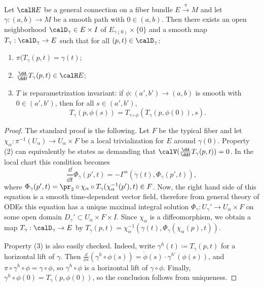 \begin{thm}\label{prop parallel tra}
    Let $\calH E$ be a general connection on a fiber bundle $E\overset{\pi}{\to}M$ and let $\gamma:(a,b)\to M$ be a smooth path with $0\in(a,b)$. Then there exists an open neighborhood $\calD_\gamma\in E\times I$ of $E_{\gamma(0)}\times\{0\}$ and a smooth map $T_\gamma:\calD_\gamma\to E$ such that for all $(p,t)\in \calD_\gamma$: 
    \begin{enumerate}[label=(\arabic*)]
        \item $\pi(T_\gamma(p,t)=\gamma(t)$;
        \item $\frac{\dd}{\dd t}T_\gamma(p,t)\in \calH E$;
        \item $T$ is reparametrization invariant: if $\phi:(a',b')\to (a,b)$ is smooth with $0\in(a',b')$, then for all $s\in (a',b')$, 
        \[T_\gamma(p,\phi(s))=T_{\gamma\circ\phi}(T_\gamma(p,\phi(0)),s).\]
    \end{enumerate}
\end{thm}
\begin{proof}
    The standard proof is the following. Let $F$ be the typical fiber and let $\chi_\alpha:\pi^{-1}(U_\alpha)\to U_\alpha\times F$ be a local trivialization for $E$ around $\gamma(0)$. Property (2) can equivalently be states as demanding that $\calV(\frac{\dd}{\dd t}T_\gamma(p,t))=0$. In the local chart this condition becomes
    \[\frac{\dd}{\dd t}\Phi_\gamma(p',t)=-\Gamma^\alpha\left(\dot\gamma(t),\Phi_\gamma(p',t)\right),\]
    where $\Phi_\gamma(p',t)=\pr_2\circ \chi_\alpha\circ T_\gamma(\chi_\alpha^{-1}(p'),t)\in F$. Now, the right hand side of this equation is a smooth time-dependent vector field, therefore from general theory of ODEs this equation has a unique maximal integral solution $\Phi_\gamma:U_\gamma'\to U_\alpha\times F$ on some open domain $D_\gamma'\subset U_\alpha\times F\times I$. Since $\chi_\alpha$ is a diffeomorphism, we obtain a map $T_\gamma:\calD_\gamma\to E$ by $T_\gamma(p,t)=\chi_\alpha^{-1}(\gamma(t),\Phi_\gamma(\chi_\alpha(p),t))$.

    Property (3) is also easily checked. Indeed, write $\gamma^h(t)\coloneqq T_\gamma(p,t)$ for a horizontal lift of $\gamma$. Then $\frac{\dd}{\dd s}(\gamma^h\circ \phi(s))=\dot\phi(s)\cdot \gamma^{h\prime}(\phi(s))$, and $\pi\circ\gamma^h\circ\phi=\gamma\circ\phi$, so $\gamma^h\circ\phi$ is a horizontal lift of $\gamma\circ\phi$. Finally, $\gamma^h\circ\phi(0)=T_\gamma(p,\phi(0))$, so the conclusion follows from uniqueness.
\end{proof}


